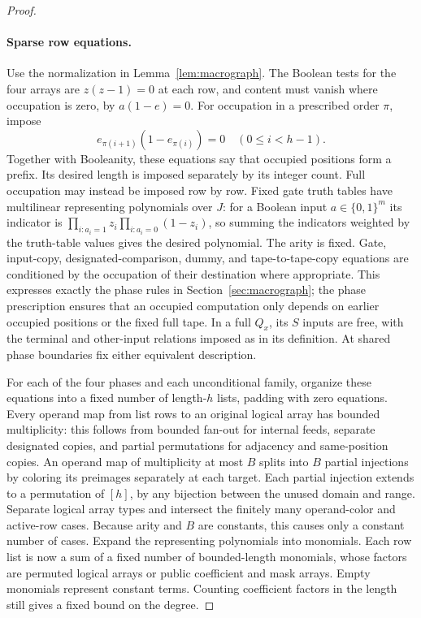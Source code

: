 \begin{proof}
\paragraph{Sparse row equations.}
Use the normalization in Lemma~\ref{lem:macrograph}.
The Boolean tests for the four arrays are $z(z-1)=0$ at each row,
and content must vanish where occupation is zero, by $a(1-e)=0$.
For occupation in a prescribed order $\pi$, impose
\[
        e_{\pi(i+1)}(1-e_{\pi(i)})=0\quad(0\le i<h-1).
\]
Together with Booleanity, these equations say that occupied positions
form a prefix.  Its desired length is imposed separately by its
integer count.  Full occupation may instead be imposed row by row.
Fixed gate truth tables have multilinear representing polynomials
over $J$: for a Boolean input $a\in\{0,1\}^m$ its indicator is
$\prod_{i:a_i=1}z_i\prod_{i:a_i=0}(1-z_i)$, so summing the indicators
weighted by the truth-table values gives the desired polynomial.
The arity is fixed.  Gate, input-copy, designated-comparison, dummy,
and tape-to-tape-copy equations are conditioned by the occupation
of their destination where appropriate.  This expresses exactly
the phase rules in Section~\ref{sec:macrograph}; the phase prescription
ensures that an occupied computation only depends on earlier occupied
positions or the fixed full tape.  In a full $Q_x$, its $S$ inputs
are free, with the terminal and other-input relations imposed as in
its definition.  At shared phase boundaries fix either equivalent
description.

For each of the four phases and each unconditional family, organize
these equations into a fixed number of length-$h$ lists, padding with
zero equations.  Every operand map from list rows to an original
logical array has bounded multiplicity: this follows from bounded
fan-out for internal feeds, separate designated copies, and partial
permutations for adjacency and same-position copies.
An operand map of multiplicity at most $B$ splits into $B$ partial
injections by coloring its preimages separately at each target.
Each partial injection extends to a permutation of $[h]$, by any
bijection between the unused domain and range.  Separate logical
array types and intersect the finitely many operand-color and
active-row cases.  Because arity and $B$ are constants, this causes
only a constant number of cases.  Expand the representing polynomials
into monomials.  Each row list is now a sum of a fixed number of
bounded-length monomials, whose factors are permuted logical arrays
or public coefficient and mask arrays.  Empty monomials represent
constant terms.  Counting coefficient factors in the length still
gives a fixed bound on the degree.


\end{proof}
